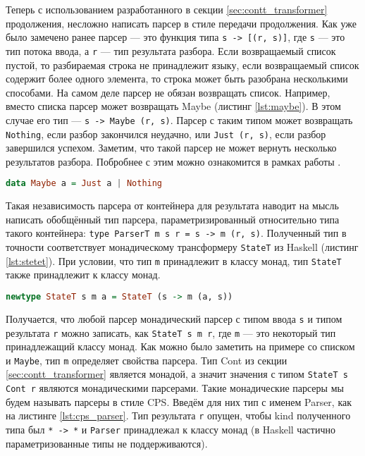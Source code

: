 \documentclass[times]{itmo-student-thesis}
\begin{document}
Теперь с использованием разработанного в секции \ref{sec:contt_transformer} продолжения, несложно написать парсер в стиле 
передачи продолжения. Как уже было замечено ранее парсер --- это функция типа \lstinline{s -> [(r, s)]}, где \lstinline{s} --- это
тип потока ввода, а \lstinline{r} --- тип результата разбора. Если возвращаемый список пустой, то разбираемая строка не принадлежит
языку, если возвращаемый список содержит более одного элемента, то строка может быть разобрана несколькими способами.
На самом деле парсер не обязан возвращать список. Например, вместо списка парсер может возвращать Maybe (листинг \ref{lst:maybe}).
В этом случае его тип --- \lstinline{s -> Maybe (r, s)}. Парсер с таким типом может возвращать \lstinline{Nothing}, если разбор 
закончился неудачно, или \lstinline{Just (r, s)}, если разбор завершился успехом. Заметим, что такой парсер не может вернуть 
несколько результатов разбора. Побробнее с этим можно ознакомится в рамках работы \cite{hutton_monadic_nodate}.

\begin{lstlisting}[language=Haskell,float=!h,caption={Тип Maybe в Haskell},label={lst:maybe}]
  data Maybe a = Just a | Nothing
\end{lstlisting}

Такая независимость парсера от контейнера для результата наводит на мысль написать обобщённый тип парсера,
параметризированный относительно типа такого контейнера: \lstinline {type ParserT m s r = s -> m (r, s)}. Полученный
тип в точности соответствует монадическому трансформеру \lstinline{StateT} из Haskell (листинг \ref{lst:stetet}). При условии, что	тип
\lstinline{m} принадлежит в классу монад, тип \lstinline{StateT} также принадлежит к классу монад. 

\begin{lstlisting}[language=Haskell,float=!h,caption={StateT трансформер монад},label={lst:stetet}]
  newtype StateT s m a = StateT (s -> m (a, s))
\end{lstlisting}

Получается, что любой парсер монадический парсер с типом ввода \lstinline{s} и типом результата \lstinline{r} можно
записать, как \lstinline{StateT s m r}, где \lstinline{m} --- это некоторый тип принадлежащий классу монад. Как можно 
было заметить на примере со списком и \lstinline{Maybe}, тип \lstinline{m} определяет свойства парсера. 
Тип Cont из секции \ref{sec:contt_transformer} является монадой, а значит значения с типом
\lstinline{StateT s Cont r} являются монадическими парсерами. Такие монадические парсеры мы будем называть парсеры
в стиле CPS. Введём для них тип с именем Parser, как на листинге \ref{lst:cps_parser}. Тип результата
\lstinline{r} опущен, чтобы kind полученного типа был \lstinline{* -> *} и \lstinline{Parser} принадлежал к
классу монад (в Haskell частично параметризованные типы не поддерживаются).
\end{document}
